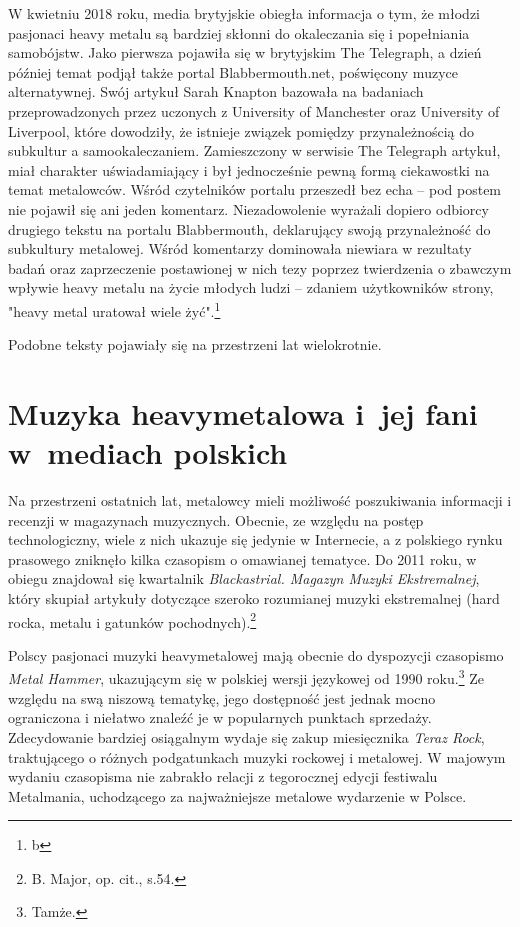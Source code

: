 \documentclass[12pt, a4paper, titlepage]{report}
\begin{document}
W kwietniu 2018 roku, media brytyjskie obiegła informacja o tym, że młodzi pasjonaci heavy metalu są bardziej skłonni do okaleczania się i popełniania samobójstw. Jako pierwsza pojawiła się w brytyjskim The Telegraph, a dzień później temat podjął także portal Blabbermouth.net, poświęcony muzyce alternatywnej. Swój artykuł Sarah Knapton bazowała na badaniach przeprowadzonych przez uczonych z University of Manchester oraz University of Liverpool, które dowodziły, że istnieje związek pomiędzy przynależnością do subkultur a samookaleczaniem. Zamieszczony w serwisie The Telegraph artykuł, miał charakter uświadamiający i był jednocześnie pewną formą ciekawostki na temat metalowców. Wśród czytelników portalu przeszedł bez echa -- pod postem nie pojawił się ani jeden komentarz. Niezadowolenie wyrażali dopiero odbiorcy drugiego tekstu na portalu Blabbermouth, deklarujący swoją przynależność do subkultury metalowej. Wśród komentarzy dominowała niewiara w rezultaty badań oraz zaprzeczenie postawionej w nich tezy poprzez twierdzenia o zbawczym wpływie heavy metalu na życie młodych ludzi -- zdaniem użytkowników strony, "heavy metal uratował wiele żyć".\footnote{b}

Podobne teksty pojawiały się na przestrzeni lat wielokrotnie. 

\section{Muzyka heavymetalowa i~jej fani w~mediach polskich}
Na przestrzeni ostatnich lat, metalowcy mieli możliwość poszukiwania informacji i recenzji w magazynach muzycznych. Obecnie, ze względu na postęp technologiczny, wiele z nich ukazuje się jedynie w Internecie, a z polskiego rynku prasowego zniknęło kilka czasopism o omawianej tematyce. Do 2011 roku, w obiegu znajdował się kwartalnik \textit{Blackastrial. Magazyn Muzyki Ekstremalnej}, który skupiał artykuły dotyczące szeroko rozumianej muzyki ekstremalnej (hard rocka, metalu i gatunków pochodnych).\footnote{B. Major, op. cit., s.54.}  

Polscy pasjonaci muzyki heavymetalowej mają obecnie do dyspozycji czasopismo \textit{Metal Hammer}, ukazującym się w polskiej wersji językowej od 1990 roku.\footnote{Tamże.} Ze względu na swą niszową tematykę, jego dostępność jest jednak mocno ograniczona i niełatwo znaleźć je w popularnych punktach sprzedaży. Zdecydowanie bardziej osiągalnym wydaje się zakup miesięcznika \textit{Teraz Rock}, traktującego o różnych podgatunkach muzyki rockowej i metalowej. W majowym wydaniu czasopisma nie zabrakło relacji z tegorocznej edycji festiwalu Metalmania, uchodzącego za najważniejsze metalowe wydarzenie w Polsce.
\end{document}
